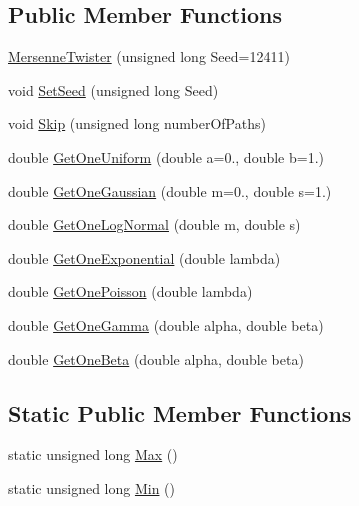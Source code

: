 \subsection*{Public Member Functions}
\begin{DoxyCompactItemize}
\item 
\hyperlink{classMersenneTwister_acf1f07fd0042402eab012c3c73e2056a}{Mersenne\+Twister} (unsigned long Seed=12411)
\item 
void \hyperlink{classMersenneTwister_a92f4f907dad1c87f60f668351cdf174d}{Set\+Seed} (unsigned long Seed)
\item 
void \hyperlink{classMersenneTwister_acadedcfe8e29f89b5d6f6dc3e82127cc}{Skip} (unsigned long number\+Of\+Paths)
\item 
double \hyperlink{classMersenneTwister_a59d15261d26fe5558c1a1556b3f61b98}{Get\+One\+Uniform} (double a=0., double b=1.)
\item 
double \hyperlink{classMersenneTwister_af0952f4bcd26592bc676638b441655c4}{Get\+One\+Gaussian} (double m=0., double s=1.)
\item 
double \hyperlink{classMersenneTwister_a555e8ce9fda71fae485a4fb85a503334}{Get\+One\+Log\+Normal} (double m, double s)
\item 
double \hyperlink{classMersenneTwister_a782c5eae24a07b8af2ee7a61bb813e0b}{Get\+One\+Exponential} (double lambda)
\item 
double \hyperlink{classMersenneTwister_a2681743b9e75ef9d3d323c22b006853e}{Get\+One\+Poisson} (double lambda)
\item 
double \hyperlink{classMersenneTwister_afdc783e314837717b1848d448e12f2fd}{Get\+One\+Gamma} (double alpha, double beta)
\item 
double \hyperlink{classMersenneTwister_aedadeab9156bff904f5538e568aec96c}{Get\+One\+Beta} (double alpha, double beta)
\end{DoxyCompactItemize}
\subsection*{Static Public Member Functions}
\begin{DoxyCompactItemize}
\item 
static unsigned long \hyperlink{classMersenneTwister_a61ef4663e8709411b422b4b1a7b40328}{Max} ()
\item 
static unsigned long \hyperlink{classMersenneTwister_a80cca98c48305912aa8cc1b6e6ce5969}{Min} ()
\end{DoxyCompactItemize}


